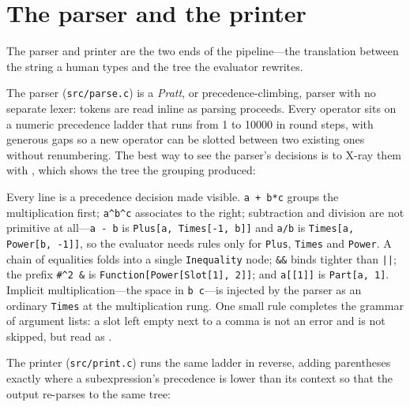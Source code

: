\section{The parser and the printer}
\label{sec:int-parse}

The parser and printer are the two ends of the pipeline---the translation between the
string a human types and the tree the evaluator rewrites.

The parser (\texttt{src/parse.c}) is a \emph{Pratt}, or precedence-climbing, parser
with no separate lexer: tokens are read inline as parsing proceeds. Every operator
sits on a numeric precedence ladder that runs from 1 to 10000 in round steps, with
generous gaps so a new operator can be slotted between two existing ones without
renumbering. The best way to see the parser's decisions is to X-ray them with
, which shows the tree the grouping produced:


Every line is a precedence decision made visible. \texttt{a + b*c} groups the
multiplication first; \texttt{a\^{}b\^{}c} associates to the right; subtraction and
division are not primitive at all---\texttt{a - b} is \texttt{Plus[a, Times[-1, b]]}
and \texttt{a/b} is \texttt{Times[a, Power[b, -1]]}, so the evaluator needs rules only
for \texttt{Plus}, \texttt{Times} and \texttt{Power}. A chain of equalities folds into
a single \texttt{Inequality} node; \texttt{\&\&} binds tighter than \texttt{||}; the
prefix \texttt{\#\^{}2 \&} is \texttt{Function[Power[Slot[1], 2]]}; and
\texttt{a[[1]]} is \texttt{Part[a, 1]}. Implicit multiplication---the space in
\texttt{b c}---is injected by the parser as an ordinary \texttt{Times} at the
multiplication rung. One small rule completes the grammar of argument lists: a slot
left empty next to a comma is not an error and is not skipped, but read as
.

\begin{codepairs}
\end{codepairs}

The printer (\texttt{src/print.c}) runs the same ladder in reverse, adding parentheses
exactly where a subexpression's precedence is lower than its context so that the output
re-parses to the same tree:

